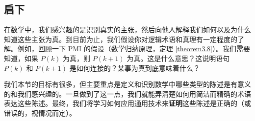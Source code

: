 \subsection{启下}

在数学中，我们感兴趣的是识别真实的主张，然后向他人解释我们如何以及为什么知道这些主张为真。到目前为止，我们假设你对逻辑术语和真理有一定程度的了解。例如，回顾一下 PMI 的假设（数学归纳原理，定理 \ref{theorem3.8}）。我们需要知道，如果 $P(k)$ 为真，则 $P(k+1)$ 为真。这是什么意思？这说明语句 $P(k)$ 和 $P(k + 1)$ 是如何连接的？某事为真到底意味着什么？

我们本节的目标有很多，但主要重点是定义和识别数学中哪些类型的陈述是有意义的和我们感兴趣的。一旦做到了这一点，我们就能弄清楚如何用简洁而精确的术语表达这些陈述。最终，我们将学习如何应用通用技术来\textbf{证明}这些陈述是正确的（或错误的，视情况而定）。
